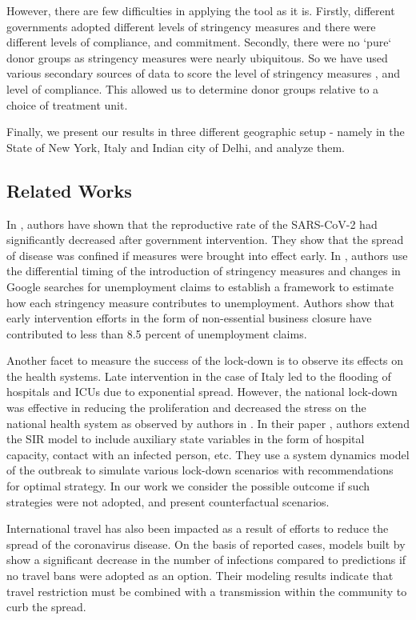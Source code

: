 \documentclass[fleqn,10pt]{wlscirep}
\begin{document}
	However, there are few difficulties in applying the tool as it is.  Firstly, different governments adopted different levels of stringency measures and there were different levels of compliance, and commitment. Secondly, there were no `pure` donor groups as stringency measures were nearly ubiquitous. So we have used various secondary sources of data to score the level of stringency measures , and level of compliance. This allowed us to determine donor groups relative to a choice of treatment unit.
	
	Finally, we present our results in three different geographic setup - namely in the State of New York, Italy and Indian city of Delhi, and analyze them. 
	
	\subsection*{Related Works}
	In \cite{Koh2020}, authors have shown that the reproductive rate of the SARS-CoV-2 had significantly decreased after government intervention. They show that the spread of disease was confined if measures were brought into effect early. In \cite{KP2020}, authors use the differential timing of the introduction of stringency measures and changes in Google searches for unemployment claims to establish a framework to estimate how each stringency measure contributes to unemployment. Authors show that early intervention efforts in the form of non-essential business closure have contributed to less than 8.5 percent of unemployment claims.
	
	Another facet to measure the success of the lock-down is to observe its effects on the health systems. Late intervention in the case of Italy led to the flooding of hospitals and ICUs due to exponential spread. However, the national lock-down was effective in reducing the proliferation and decreased the stress on the national health system as observed by authors in \cite{Supino2020}. In their paper \cite{IVEGA2020},  authors extend the SIR model to include auxiliary state variables in the form of hospital capacity, contact with an infected person, etc. They use a system dynamics model of the outbreak to simulate various lock-down scenarios with recommendations for optimal strategy. In our work we consider the possible outcome if such strategies were not adopted,  and present counterfactual scenarios.
	
	International travel has also been impacted as a result of efforts to reduce the spread of the coronavirus disease. On the basis of reported cases, models built by \cite{Chinazzi395} show a significant decrease in the number of infections compared to predictions if no travel bans were adopted as an option. Their modeling results indicate that travel restriction must be combined with a transmission within the community to curb the spread.
\end{document}
